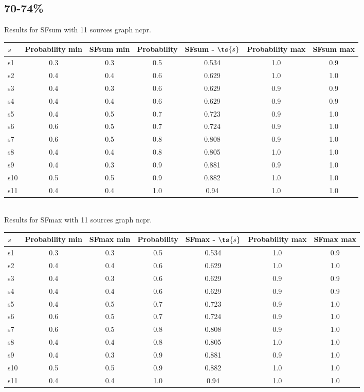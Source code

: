 \documentclass{article}
\begin{document}
\newpage

\subsection{70-74\%}

\noindent Results for SFsum with 11 sources graph ncpr.

\noindent\begin{tabular}{|l|c|c|c|c|c|c|}
\hline
$s$& Probability min & SFsum min & Probability & SFsum - $\ts{s}$ & Probability max & SFsum max\\
\hline
s1 &0.3 & 0.3 & 0.5 & 0.534 & 1.0 & 0.9\\
\hline
s2 &0.4 & 0.4 & 0.6 & 0.629 & 1.0 & 1.0\\
\hline
s3 &0.4 & 0.3 & 0.6 & 0.629 & 0.9 & 0.9\\
\hline
s4 &0.4 & 0.4 & 0.6 & 0.629 & 0.9 & 0.9\\
\hline
s5 &0.4 & 0.5 & 0.7 & 0.723 & 0.9 & 1.0\\
\hline
s6 &0.6 & 0.5 & 0.7 & 0.724 & 0.9 & 1.0\\
\hline
s7 &0.6 & 0.5 & 0.8 & 0.808 & 0.9 & 1.0\\
\hline
s8 &0.4 & 0.4 & 0.8 & 0.805 & 1.0 & 1.0\\
\hline
s9 &0.4 & 0.3 & 0.9 & 0.881 & 0.9 & 1.0\\
\hline
s10 &0.5 & 0.5 & 0.9 & 0.882 & 1.0 & 1.0\\
\hline
s11 &0.4 & 0.4 & 1.0 & 0.94 & 1.0 & 1.0\\
\hline
\end{tabular}\\

\noindent Results for SFmax with 11 sources graph ncpr.

\noindent\begin{tabular}{|l|c|c|c|c|c|c|}
\hline
$s$& Probability min & SFmax min & Probability & SFmax - $\ts{s}$ & Probability max & SFmax max\\
\hline
s1 &0.3 & 0.3 & 0.5 & 0.534 & 1.0 & 0.9\\
\hline
s2 &0.4 & 0.4 & 0.6 & 0.629 & 1.0 & 1.0\\
\hline
s3 &0.4 & 0.3 & 0.6 & 0.629 & 0.9 & 0.9\\
\hline
s4 &0.4 & 0.4 & 0.6 & 0.629 & 0.9 & 0.9\\
\hline
s5 &0.4 & 0.5 & 0.7 & 0.723 & 0.9 & 1.0\\
\hline
s6 &0.6 & 0.5 & 0.7 & 0.724 & 0.9 & 1.0\\
\hline
s7 &0.6 & 0.5 & 0.8 & 0.808 & 0.9 & 1.0\\
\hline
s8 &0.4 & 0.4 & 0.8 & 0.805 & 1.0 & 1.0\\
\hline
s9 &0.4 & 0.3 & 0.9 & 0.881 & 0.9 & 1.0\\
\hline
s10 &0.5 & 0.5 & 0.9 & 0.882 & 1.0 & 1.0\\
\hline
s11 &0.4 & 0.4 & 1.0 & 0.94 & 1.0 & 1.0\\
\hline
\end{tabular}\\
\end{document}
